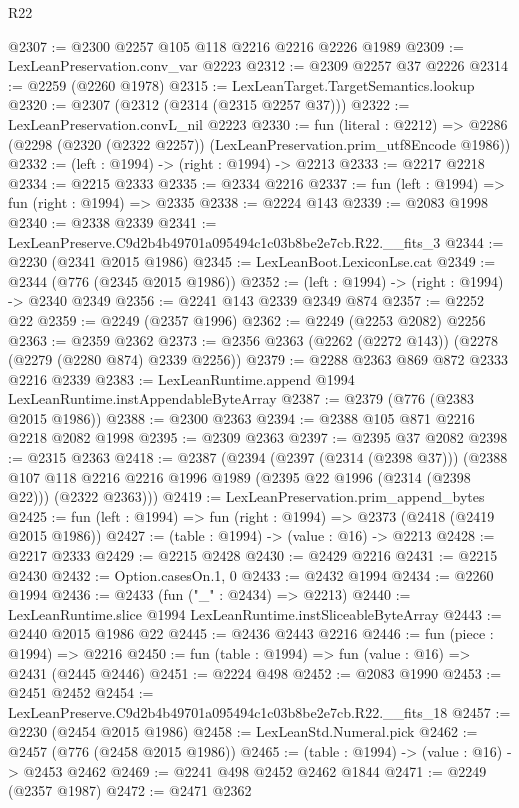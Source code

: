 \begin{lexlean}{R22}
\begin{coremodule}
@2307 := @2300 @2257 @105 @118 @2216 @2216 @2226 @1989
@2309 := LexLeanPreservation.conv_var @2223
@2312 := @2309 @2257 @37 @2226
@2314 := @2259 (@2260 @1978)
@2315 := LexLeanTarget.TargetSemantics.lookup
@2320 := @2307 (@2312 (@2314 (@2315 @2257 @37)))
@2322 := LexLeanPreservation.convL_nil @2223
@2330 := fun (literal : @2212) =>
  @2286 (@2298 (@2320 (@2322 @2257)) (LexLeanPreservation.prim_utf8Encode @1986))
@2332 := (left : @1994) -> (right : @1994) -> @2213
@2333 := @2217 @2218
@2334 := @2215 @2333
@2335 := @2334 @2216
@2337 := fun (left : @1994) => fun (right : @1994) => @2335
@2338 := @2224 @143
@2339 := @2083 @1998
@2340 := @2338 @2339
@2341 := LexLeanPreserve.C9d2b4b49701a095494c1c03b8be2e7cb.R22.__fits_3
@2344 := @2230 (@2341 @2015 @1986)
@2345 := LexLeanBoot.LexiconLse.cat
@2349 := @2344 (@776 (@2345 @2015 @1986))
@2352 := (left : @1994) -> (right : @1994) -> @2340 @2349
@2356 := @2241 @143 @2339 @2349 @874
@2357 := @2252 @22
@2359 := @2249 (@2357 @1996)
@2362 := @2249 (@2253 @2082) @2256
@2363 := @2359 @2362
@2373 := @2356 @2363 (@2262 (@2272 @143)) (@2278 (@2279 (@2280 @874) @2339 @2256))
@2379 := @2288 @2363 @869 @872 @2333 @2216 @2339
@2383 := LexLeanRuntime.append @1994 LexLeanRuntime.instAppendableByteArray
@2387 := @2379 (@776 (@2383 @2015 @1986))
@2388 := @2300 @2363
@2394 := @2388 @105 @871 @2216 @2218 @2082 @1998
@2395 := @2309 @2363
@2397 := @2395 @37 @2082
@2398 := @2315 @2363
@2418 := @2387
    (@2394
      (@2397 (@2314 (@2398 @37)))
      (@2388 @107 @118 @2216 @2216 @1996 @1989 (@2395 @22 @1996 (@2314 (@2398 @22))) (@2322 @2363)))
@2419 := LexLeanPreservation.prim_append_bytes
@2425 := fun (left : @1994) => fun (right : @1994) => @2373 (@2418 (@2419 @2015 @1986))
@2427 := (table : @1994) -> (value : @16) -> @2213
@2428 := @2217 @2333
@2429 := @2215 @2428
@2430 := @2429 @2216
@2431 := @2215 @2430
@2432 := Option.casesOn.{1, 0}
@2433 := @2432 @1994
@2434 := @2260 @1994
@2436 := @2433 (fun ("_" : @2434) => @2213)
@2440 := LexLeanRuntime.slice @1994 LexLeanRuntime.instSliceableByteArray
@2443 := @2440 @2015 @1986 @22
@2445 := @2436 @2443 @2216
@2446 := fun (piece : @1994) => @2216
@2450 := fun (table : @1994) => fun (value : @16) => @2431 (@2445 @2446)
@2451 := @2224 @498
@2452 := @2083 @1990
@2453 := @2451 @2452
@2454 := LexLeanPreserve.C9d2b4b49701a095494c1c03b8be2e7cb.R22.__fits_18
@2457 := @2230 (@2454 @2015 @1986)
@2458 := LexLeanStd.Numeral.pick
@2462 := @2457 (@776 (@2458 @2015 @1986))
@2465 := (table : @1994) -> (value : @16) -> @2453 @2462
@2469 := @2241 @498 @2452 @2462 @1844
@2471 := @2249 (@2357 @1987)
@2472 := @2471 @2362

\end{coremodule}
\end{lexlean}

